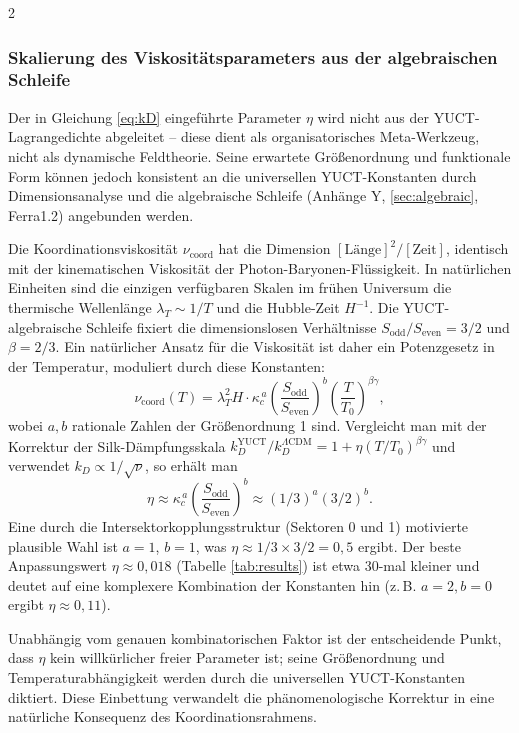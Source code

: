 \documentclass[11pt,a4paper]{article}
\begin{document}
\begin{multicols}{2}
		\subsubsection{Skalierung des Viskositätsparameters aus der algebraischen Schleife}
		\label{subsubsec:viscosity_scaling}
		
		Der in Gleichung \eqref{eq:kD} eingeführte Parameter $\eta$ wird nicht aus der YUCT-Lagrangedichte abgeleitet – diese dient als organisatorisches Meta-Werkzeug, nicht als dynamische Feldtheorie. Seine erwartete Größenordnung und funktionale Form können jedoch konsistent an die universellen YUCT-Konstanten durch Dimensionsanalyse und die algebraische Schleife (Anhänge Y, \ref{sec:algebraic}, Ferra1.2) angebunden werden.
		
		Die Koordinationsviskosität $\nu_{\mathrm{coord}}$ hat die Dimension $[\text{Länge}]^2/[\text{Zeit}]$, identisch mit der kinematischen Viskosität der Photon-Baryonen-Flüssigkeit. In natürlichen Einheiten sind die einzigen verfügbaren Skalen im frühen Universum die thermische Wellenlänge $\lambda_T \sim 1/T$ und die Hubble-Zeit $H^{-1}$. Die YUCT-algebraische Schleife fixiert die dimensionslosen Verhältnisse $S_{\mathrm{odd}}/S_{\mathrm{even}} = 3/2$ und $\beta = 2/3$. Ein natürlicher Ansatz für die Viskosität ist daher ein Potenzgesetz in der Temperatur, moduliert durch diese Konstanten:
		\begin{equation}
			\nu_{\mathrm{coord}}(T) = \lambda_T^2 H \cdot \kappa_c^{\,a} \left(\frac{S_{\mathrm{odd}}}{S_{\mathrm{even}}}\right)^b \left(\frac{T}{T_0}\right)^{\beta\gamma},
		\end{equation}
		wobei $a,b$ rationale Zahlen der Größenordnung 1 sind. Vergleicht man mit der Korrektur der Silk-Dämpfungsskala $k_D^{\mathrm{YUCT}}/k_D^{\Lambda\mathrm{CDM}} = 1 + \eta (T/T_0)^{\beta\gamma}$ und verwendet $k_D \propto 1/\sqrt{\nu}$, so erhält man
		\begin{equation}
			\eta \approx \kappa_c^{\,a} \left(\frac{S_{\mathrm{odd}}}{S_{\mathrm{even}}}\right)^b \approx (1/3)^a (3/2)^b.
		\end{equation}
		Eine durch die Intersektorkopplungsstruktur (Sektoren 0 und 1) motivierte plausible Wahl ist $a=1$, $b=1$, was $\eta \approx 1/3 \times 3/2 = 0,5$ ergibt. Der beste Anpassungswert $\eta \approx 0,018$ (Tabelle \ref{tab:results}) ist etwa 30-mal kleiner und deutet auf eine komplexere Kombination der Konstanten hin (z. B. $a=2, b=0$ ergibt $\eta \approx 0,11$).
		
		Unabhängig vom genauen kombinatorischen Faktor ist der entscheidende Punkt, dass $\eta$ kein willkürlicher freier Parameter ist; seine Größenordnung und Temperaturabhängigkeit werden durch die universellen YUCT-Konstanten diktiert. Diese Einbettung verwandelt die phänomenologische Korrektur in eine natürliche Konsequenz des Koordinationsrahmens.
		

\end{multicols}
\end{document}
